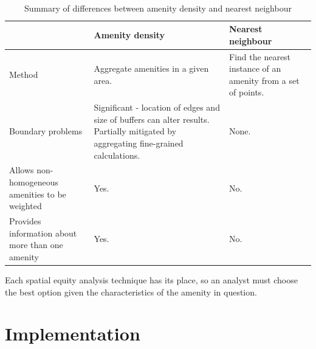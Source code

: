 \documentclass[12pt,a4paper]{article}
\begin{document}
\begin{table}[!htbp]
	\caption{Summary of differences between amenity density and nearest neighbour}
	\centering %
	\ ~~~~ \\ %
	\label{tab:differences}
	\renewcommand{\arraystretch}{1.5} %
	\begin{tabular}{|L|L|L|}
		\hline
		& \textbf{Amenity density} & \textbf{Nearest neighbour} \\
		\hline
		Method & Aggregate amenities in a given area. & Find the nearest instance of an amenity from a set of points. \\
		\hline
		Boundary problems & Significant - location of edges and size of buffers can alter results. Partially mitigated by aggregating fine-grained calculations. & None. \\
		\hline
		Allows non-homogeneous amenities to be weighted & Yes. & No. \\
		\hline
		Provides information about more than one amenity & Yes. & No. \\
		\hline
	\end{tabular}
\end{table}

Each spatial equity analysis technique has its place, so an analyst must choose the best option given the characteristics of the amenity in question.

\section{Implementation}
\end{document}
